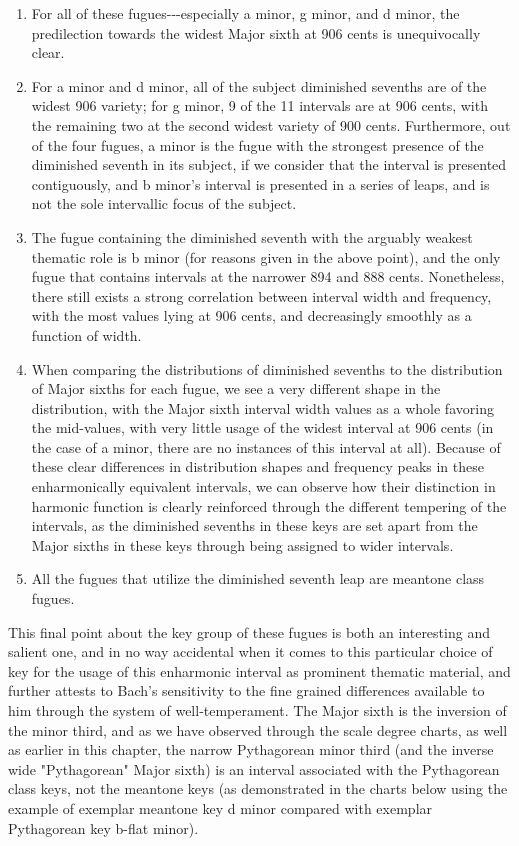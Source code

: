 \begin{enumerate}
\def\labelenumi{\arabic{enumi}.}
\tightlist
\item
  For all of these fugues-\/-\/-especially a minor, g minor, and d
  minor, the predilection towards the widest Major sixth at 906 cents is
  unequivocally clear.
\item
  For a minor and d minor, all of the subject diminished sevenths are of
  the widest 906 variety; for g minor, 9 of the 11 intervals are at 906
  cents, with the remaining two at the second widest variety of 900
  cents. Furthermore, out of the four fugues, a minor is the fugue with
  the strongest presence of the diminished seventh in its subject, if we
  consider that the interval is presented contiguously, and b minor's
  interval is presented in a series of leaps, and is not the sole
  intervallic focus of the subject.
\item
  The fugue containing the diminished seventh with the arguably weakest
  thematic role is b minor (for reasons given in the above point), and
  the only fugue that contains intervals at the narrower 894 and 888
  cents. Nonetheless, there still exists a strong correlation between
  interval width and frequency, with the most values lying at 906 cents,
  and decreasingly smoothly as a function of width.
\item
  When comparing the distributions of diminished sevenths to the
  distribution of Major sixths for each fugue, we see a very different
  shape in the distribution, with the Major sixth interval width values
  as a whole favoring the mid-values, with very little usage of the
  widest interval at 906 cents (in the case of a minor, there are no
  instances of this interval at all). Because of these clear differences
  in distribution shapes and frequency peaks in these enharmonically
  equivalent intervals, we can observe how their distinction in harmonic
  function is clearly reinforced through the different tempering of the
  intervals, as the diminished sevenths in these keys are set apart from
  the Major sixths in these keys through being assigned to wider
  intervals.
\item
  All the fugues that utilize the diminished seventh leap are meantone
  class fugues.
\end{enumerate}

This final point about the key group of these fugues is both an
interesting and salient one, and in no way accidental when it comes to
this particular choice of key for the usage of this enharmonic interval
as prominent thematic material, and further attests to Bach's
sensitivity to the fine grained differences available to him through the
system of well-temperament. The Major sixth is the inversion of the
minor third, and as we have observed through the scale degree charts, as
well as earlier in this chapter, the narrow Pythagorean minor third (and
the inverse wide "Pythagorean" Major sixth) is an interval associated
with the Pythagorean class keys, not the meantone keys (as demonstrated
in the charts below using the example of exemplar meantone key d minor
compared with exemplar Pythagorean key b-flat minor).


